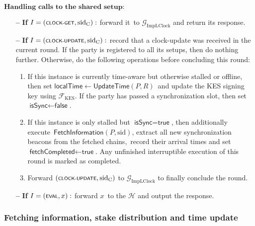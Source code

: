 \begin{protocol}
\begin{algorithmic}
        \State $\textbf{Handling calls to the shared setup:}$
        \begin{itemize}
            \item[\textbf{--}] \textbf{If} $I = (\textsf{\scriptsize{CLOCK-GET}}, \text{sid}_\text{C}):$ forward it\
            to $\mathcal{G}_{\text{ImpLClock}}$ and return its response.
            \item[\textbf{--}] \textbf{If} $I = (\textsf{\scriptsize{CLOCK-UPDATE}}, \text{sid}_\text{C}):$ record that a clock-update was received in the current round.
            If the party is registered to all its setups,  then do nothing further.
            Otherwise,  do the following operations before concluding this round:
            \begin{enumerate}
                \item If this instance is currently time-aware but otherwise stalled or offline, then set $\textsf{localTime} \leftarrow \textsf{UpdateTime}(P, R)$\
                and update the KES signing key using $\mathcal{F}_{\text{KES}}$.
                If the party has passed a synchronization slot, then set $\textsf{isSync}  \leftarrow  \textsf{false}$.
                \item If this instance is only stalled but $\textsf{isSync}  =  \textsf{true}$, then additionally execute\
                \hyperref[apndx:fetch-info-protocol]{$\textsf{FetchInformation}$}$(P, \text{sid})$, extract all new synchronization beacons from the fetched chains,\
                record their arrival times and set $\textsf{fetchCompleted}  \leftarrow  \textsf{true}$.
                Any unfinished interruptible execution of this round is marked as completed.
                \item Forward $(\textsf{\scriptsize{CLOCK-UPDATE}}, \text{sid}_\text{C})$ to $\mathcal{G}_{\text{ImpLClock}}$ to finally conclude the round.
            \end{enumerate}
            \item[\textbf{--}] \textbf{If} $I = (\textsf{\scriptsize{EVAL}}, x):$ forward $x$\
            to the $\mathcal{H}$ and output the response.
        \end{itemize}


    \end{algorithmic}\label{alg:spectrum-protocol}
\end{protocol}

\subsubsection{Fetching information, stake distribution and time update}


